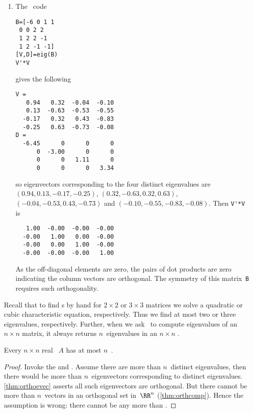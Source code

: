 \begin{example}
\begin{solution}
\begin{enumerate}
\item The \script\ code 
\setbox\ajrqrbox\hbox{}%
\marginajrbox%
\begin{verbatim}
B=[-6 0 1 1
 0 0 2 2
 1 2 2 -1
 1 2 -1 -1]
[V,D]=eig(B)
V'*V
\end{verbatim}
gives the following \twodp
\begin{verbatim}
V =
   0.94   0.32  -0.04  -0.10
   0.13  -0.63  -0.53  -0.55
  -0.17   0.32   0.43  -0.83
  -0.25   0.63  -0.73  -0.08
D =
  -6.45      0      0      0
      0  -3.00      0      0
      0      0   1.11      0
      0      0      0   3.34
\end{verbatim}
so eigenvectors corresponding to the four distinct eigenvalues are
\((0.94,0.13,-0.17,-0.25)\), \((0.32,-0.63,0.32,0.63)\), \((-0.04,-0.53,0.43,-0.73)\) and \((-0.10,-0.55,-0.83,-0.08)\).
Then \verb|V'*V| is \twodp
\begin{verbatim}
   1.00  -0.00  -0.00  -0.00
  -0.00   1.00   0.00  -0.00
  -0.00   0.00   1.00  -0.00
  -0.00  -0.00  -0.00   1.00
\end{verbatim}
As the off-diagonal elements are zero, the pairs of dot products are zero indicating the column vectors are orthogonal.  
The symmetry of this matrix~\verb|B| requires such orthogonality.
\end{enumerate}
\end{solution}
\end{example}





Recall that to find s by hand for \(2\times2\) or \(3\times 3\) matrices we solve a quadratic or cubic characteristic equation, respectively.
Thus we find at most two or three eigenvalues, respectively.
Further, when we ask \script\ to compute eigenvalues of an \(n\times n\) matrix, it always returns \(n\)~eigenvalues in an \(n\times n\) .


\begin{theorem} \label{thm:lenlam}
Every \(n\times n\) real ~\(A\) has at most \(n\)~.
\end{theorem}
\begin{proof} 
Invoke the  and . 
Assume there are more than \(n\)~distinct eigenvalues, then there would be more than \(n\)~eigenvectors corresponding to distinct eigenvalues.
\autoref{thm:orthoevec} asserts all such eigenvectors are orthogonal. 
But there cannot be more than \(n\)~vectors in an orthogonal set in~\(\RR^n\) (\autoref{thm:orthcomp}).
Hence the assumption is wrong: there cannot be any more than .
\end{proof}


